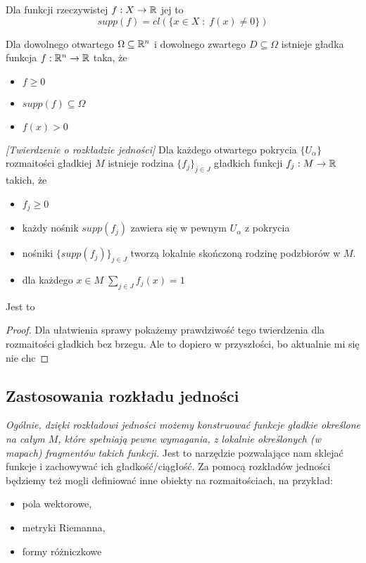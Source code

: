 \begin{definition}
Dla funkcji rzeczywistej $f:X\to\mathbb{R}$ jej  to
$$supp(f)=cl(\{x\in X\;:\;f(x)\neq0\})$$
\end{definition}

\begin{fact}
Dla dowolnego otwartego $\Omega\subseteq\mathbb{R}^n$ i dowolnego zwartego $D\subseteq\Omega$ istnieje gładka funkcja $f:\mathbb{R}^n\to\mathbb{R}$ taka, że 
\begin{itemize}
    \item $f\geq0$
    \item $supp(f)\subseteq\Omega$
    \item $f(x)>0$
\end{itemize}
\end{fact}

\begin{theorem}
\emph{[Twierdzenie o rozkładzie jedności]} Dla każdego otwartego pokrycia $\{U_\alpha\}$ rozmaitości gładkiej $M$ istnieje rodzina $\{f_j\}_{j\in J}$ gładkich funkcji $f_j:M\to\mathbb{R}$ takich, że
\begin{itemize}
    \item $f_j\geq0$
    \item każdy nośnik $supp(f_j)$ zawiera się w pewnym $U_\alpha$ z pokrycia
    \item nośniki $\{supp(f_j)\}_{j\in J}$ tworzą lokalnie skończoną rodzinę podzbiorów w $M$.
    \item dla każdego $x\in M\;\sum\limits_{j\in J}f_j(x)=1$
\end{itemize}
Jest to 
\end{theorem}
\begin{proof}
Dla ułatwienia sprawy pokażemy prawdziwość tego twierdzenia dla rozmaitości gładkich bez brzegu. Ale to dopiero w przyszłości, bo aktualnie mi się nie chc
\end{proof}

\subsection{Zastosowania rozkładu jedności}

\emph{Ogólnie, dzięki rozkładowi jedności możemy konstruować funkcje gładkie określone na całym $M$, które spełniają pewne wymagania, z lokalnie określonych (w mapach) fragmentów takich funkcji.} Jest to narzędzie pozwalające nam sklejać funkcje i zachowywać ich gładkość/ciągłość. Za pomocą rozkładów jedności będziemy też mogli definiować inne obiekty na rozmaitościach, na przykład:
\begin{itemize}
    \item pola wektorowe,
    \item metryki Riemanna,
    \item formy różniczkowe
\end{itemize}

